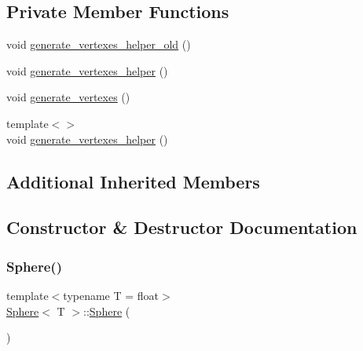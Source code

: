 \subsection*{Private Member Functions}
\begin{DoxyCompactItemize}
\item 
void \mbox{\hyperlink{classSphere_ab739ad1931e58a4ba7c84e3ca5c1965d}{generate\+\_\+vertexes\+\_\+helper\+\_\+old}} ()
\item 
void \mbox{\hyperlink{classSphere_a84a45f41ca9e630beb97fc106b359ffd}{generate\+\_\+vertexes\+\_\+helper}} ()
\item 
void \mbox{\hyperlink{classSphere_a9cfac85b9803fadc4b79db0ea047f679}{generate\+\_\+vertexes}} ()
\item 
{\footnotesize template$<$$>$ }\\void \mbox{\hyperlink{classSphere_a4482d172ff8a10920c63fdea328a2514}{generate\+\_\+vertexes\+\_\+helper}} ()
\end{DoxyCompactItemize}
\subsection*{Additional Inherited Members}


\subsection{Constructor \& Destructor Documentation}
\mbox{\label{classSphere_acacfd6de079ea50acdaf57b823166651}} 
\subsubsection{\texorpdfstring{Sphere()}{Sphere()}\hspace{0.1cm}{\footnotesize\ttfamily [1/3]}}
{\footnotesize\ttfamily template$<$typename T  = float$>$ \\
\mbox{\hyperlink{classSphere}{Sphere}}$<$ T $>$\+::\mbox{\hyperlink{classSphere}{Sphere}} (\begin{DoxyParamCaption}{ }\end{DoxyParamCaption})\hspace{0.3cm}{\ttfamily [inline]}}

\mbox{\label{classSphere_af0d667b078ae88955113205112d9aaa6}} 
